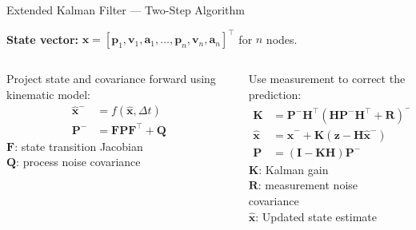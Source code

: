 \documentclass[aspectratio=169]{beamer}
\begin{document}
\begin{frame}{Extended Kalman Filter — Two-Step Algorithm}

  \textbf{State vector:} $\mathbf{x} = [\mathbf{p}_1, \mathbf{v}_1, \mathbf{a}_1, \ldots, \mathbf{p}_n, \mathbf{v}_n, \mathbf{a}_n]^\top$ for $n$ nodes.

  \vspace{0.6em}
  \begin{columns}[T]

    \begin{column}{0.48\textwidth}
      \begin{tcolorbox}[colback=compgreen!15, colframe=compgreen,
                        title={Prediction Step},
                        fonttitle=\bfseries\small, coltitle=white,
                        arc=4pt, boxrule=1pt]
        \small
        Project state and covariance forward using kinematic model:
        \vspace{0.3em}
        \begin{align*}
          \hat{\mathbf{x}}^- &= f(\hat{\mathbf{x}}, \Delta t)\\
          \mathbf{P}^- &= \mathbf{F}\mathbf{P}\mathbf{F}^\top + \mathbf{Q}
        \end{align*}
        $\mathbf{F}$: state transition Jacobian\\
        $\mathbf{Q}$: process noise covariance
      \end{tcolorbox}
    \end{column}

    \begin{column}{0.48\textwidth}
      \begin{tcolorbox}[colback=damporange!15, colframe=damporange,
                        title={Update (Correction) Step},
                        fonttitle=\bfseries\small, coltitle=white,
                        arc=4pt, boxrule=1pt]
        \small
        Use measurement to correct the prediction:
        \vspace{0.3em}
        \begin{align*}
          \mathbf{K} &= \mathbf{P}^-\mathbf{H}^\top(\mathbf{H}\mathbf{P}^-\mathbf{H}^\top+\mathbf{R})^{-1}\\
          \hat{\mathbf{x}} &= \hat{\mathbf{x}}^- + \mathbf{K}(\mathbf{z} - \mathbf{H}\hat{\mathbf{x}}^-)\\
          \mathbf{P} &= (\mathbf{I} - \mathbf{K}\mathbf{H})\mathbf{P}^-
        \end{align*}
        $\mathbf{K}$: Kalman gain\\
        $\mathbf{R}$: measurement noise covariance\\
        $\hat{\mathbf{x}}$: Updated state estimate
      \end{tcolorbox}
    \end{column}

  \end{columns}

\end{frame}
\end{document}
